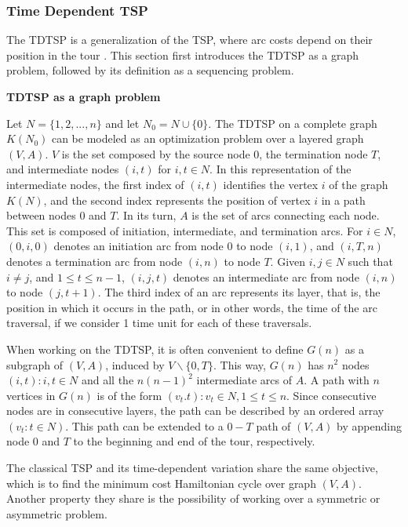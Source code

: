 \subsubsection{Time Dependent TSP}
\label{sec:time-dependent-tsp}

The \ac{TDTSP} is a generalization of the TSP, where arc costs depend on their position in the tour \cite{time_dependent_tsp, tdtsp_single_machine}. This section first introduces the TDTSP as a graph problem, followed by its definition as a sequencing problem. 

\textbf{TDTSP as a graph problem}

Let $N = \{1, 2, ..., n\}$ and let $N_{0} = N \cup \{0\}$. The TDTSP on a complete graph $K(N_{0})$ can be modeled as an optimization problem over a layered graph $(V, A)$. $V$ is the set composed by the source node $0$, the termination node $T$, and intermediate nodes $(i, t)$ for $i, t \in N$. In this representation of the intermediate nodes, the first index of $(i, t)$ identifies the vertex $i$ of the graph $K(N)$, and the second index represents the position of vertex $i$ in a path between nodes $0$ and $T$. In its turn, $A$ is the set of arcs connecting each node. This set is composed of initiation, intermediate, and termination arcs. For $i \in N$, $(0, i, 0)$ denotes an initiation arc from node 0 to node $(i, 1)$, and $(i, T, n)$ denotes a termination arc from node $(i, n)$ to node $T$. Given $i, j \in N$ such that $i \neq j$, and $1 \leq t \leq n-1$, $(i,j,t)$ denotes an intermediate arc from node $(i,n)$ to node $(j, t+1)$. The third index of an arc represents its layer, that is, the position in which it occurs in the path, or in other words, the time of the arc traversal, if we consider 1 time unit for each of these traversals.

When working on the TDTSP, it is often convenient to define $G(n)$ as a subgraph of $(V, A)$, induced by $V\backslash\{0, T\}$. %
This way, $G(n)$ has $n^2$ nodes ${(i, t): i, t \in N}$ and all the $n(n-1)^2$ intermediate arcs of $A$. A path with $n$ vertices in $G(n)$ is of the form ${(v_{t}. t): v_{t} \in N, 1 \leq t \leq n}$. Since consecutive nodes are in consecutive layers, the path can be described by an ordered array $(v_{t}: t \in N)$. This path can be extended to a $0-T$ path of $(V,A)$ by appending node $0$ and $T$ to the beginning and end of the tour, respectively.

The classical TSP and its time-dependent variation share the same objective, which is to find the minimum cost Hamiltonian cycle over graph $(V, A)$. Another property they share is the possibility of working over a symmetric or asymmetric problem.


